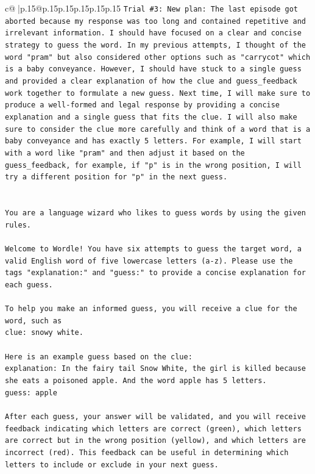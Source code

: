 \documentclass{article}
\begin{document}
{\begin{supertabular}{c@{$\;$}|p{.15\linewidth}@{}p{.15\linewidth}p{.15\linewidth}p{.15\linewidth}p{.15\linewidth}p{.15\linewidth}}
{{{\texttt{Trial \#3: New plan: The last episode got aborted because my response was too long and contained repetitive and irrelevant information. I should have focused on a clear and concise strategy to guess the word. In my previous attempts, I thought of the word "pram" but also considered other options such as "carrycot" which is a baby conveyance. However, I should have stuck to a single guess and provided a clear explanation of how the clue and guess\_feedback work together to formulate a new guess. Next time, I will make sure to produce a well{-}formed and legal response by providing a concise explanation and a single guess that fits the clue. I will also make sure to consider the clue more carefully and think of a word that is a baby conveyance and has exactly 5 letters. For example, I will start with a word like "pram" and then adjust it based on the guess\_feedback, for example, if "p" is in the wrong position, I will try a different position for "p" in the next guess.} \\
\\ 
\\ 
\texttt{You are a language wizard who likes to guess words by using the given rules.} \\
\\ 
\texttt{Welcome to Wordle! You have six attempts to guess the target word, a valid English word of five lowercase letters (a{-}z). Please use the tags "explanation:" and "guess:" to provide a concise explanation for each guess.} \\
\\ 
\texttt{To help you make an informed guess, you will receive a clue for the word, such as} \\
\texttt{clue: snowy white.} \\
\\ 
\texttt{Here is an example guess based on the clue:} \\
\texttt{explanation: In the fairy tail Snow White, the girl is killed because she eats a poisoned apple. And the word apple has 5 letters.} \\
\texttt{guess: apple} \\
\\ 
\texttt{After each guess, your answer will be validated, and you will receive feedback indicating which letters are correct (green), which letters are correct but in the wrong position (yellow), and which letters are incorrect (red). This feedback can be useful in determining which letters to include or exclude in your next guess.} \\
}}}
\end{supertabular}}
\end{document}
